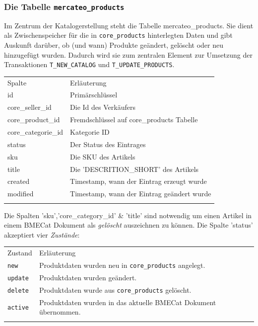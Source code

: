 	\subsubsection{Die Tabelle \texttt{mercateo\_products}}

	Im Zentrum der Katalogerstellung steht die Tabelle mercateo\_products. Sie dient als Zwischenspeicher für die in \texttt{core\_products} hinterlegten Daten und gibt Auskunft darüber, ob (und wann) Produkte geändert, gelöscht oder neu hinzugefügt wurden. Dadurch wird sie zum zentralen Element zur Umsetzung der Transaktionen \texttt{T\_NEW\_CATALOG} und \texttt{T\_UPDATE\_PRODUCTS}. 
	
	\begin{table}[!htbp]
		\begin{tabularx}{\textwidth}{p{4cm} X}
		\rowcolor[HTML]{EFEFEF} 
		Spalte & Erläuterung \\ \cline{1-2} \addlinespace[7pt]
		id & Primärschlüssel \\
		core\_seller\_id & Die Id des Verkäufers \\
		core\_product\_id & Fremdschlüssel auf core\_products Tabelle \\
		core\_categorie\_id & Kategorie ID  \\
		status & Der Status des Eintrages \\
		sku & Die SKU des Artikels \\
		title & Die 'DESCRITION\_SHORT' des Artikels  \\ 
		created & Timestamp, wann der Eintrag erzeugt wurde  \\
		modified & Timestamp, wann der Eintrag geändert wurde  \\\addlinespace[7pt] \cline{1-2} 
		\end{tabularx}%
	\end{table}
	
	Die Spalten 'sku','core\_category\_id' \& 'title' sind notwendig um einen Artikel in einem BMECat Dokument als \textit{gelöscht} auszeichnen zu können. Die Spalte 'status' akzeptiert vier  \textit{Zustände}: 
	

	\begin{tabularx}{\textwidth}{p{3cm} X}
	\rowcolor[HTML]{EFEFEF} 
	Zustand & Erläuterung \\ \cline{1-2} \addlinespace[7pt]
	\texttt{new} & Produktdaten wurden neu in \texttt{core\_products} angelegt. \\
	\texttt{update} & Produktdaten wurden geändert. \\
	\texttt{delete} & Produktdaten wurde aus \texttt{core\_products} gelöscht. \\
	\texttt{active} & Produktdaten wurden in das aktuelle BMECat Dokument übernommen. \\
	   \addlinespace[7pt] \cline{1-2} 
	\end{tabularx}%
		
